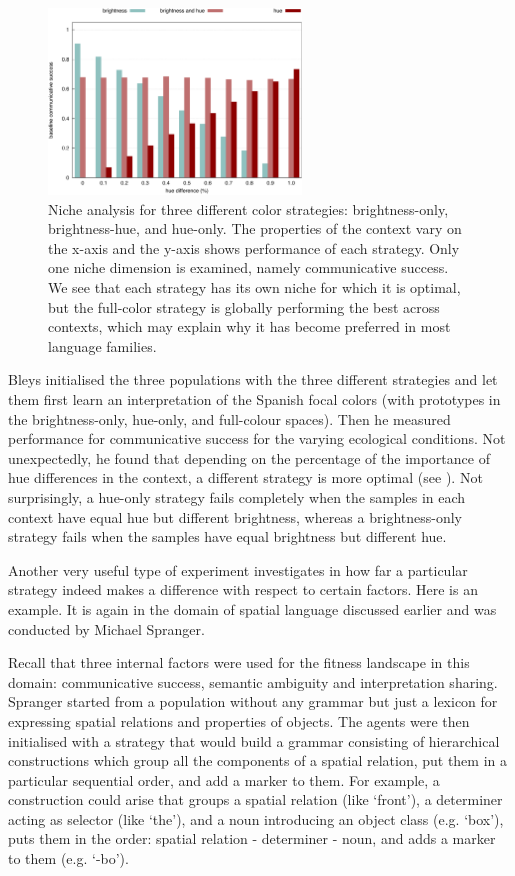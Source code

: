 \begin{figure}[htb!]
\centerline{
\includegraphics[width=0.6\textwidth]{chap12/figs/selective-advantage-bar.pdf}
}
\caption{{Niche analysis for three different 
color strategies: brightness-only, brightness-hue, and hue-only. 
The properties of the context vary on the x-axis and the y-axis shows performance of each strategy.
Only one niche dimension is examined, namely communicative success. 
We see that each strategy has its own niche for which it is optimal, but the full-color strategy is globally 
performing the best across contexts, which may explain why it has become preferred in most language families. 
\label{fig:bar}}
} 
\end{figure} 

Bleys initialised the three populations with the three different strategies and let them first learn an interpretation of 
the Spanish focal colors (with prototypes in the brightness-only, hue-only, and full-colour spaces). Then he measured 
performance for communicative success for the varying ecological conditions. 
Not unexpectedly, he found that depending on the percentage of the importance of hue differences in the context, a different strategy 
is more optimal (see ). Not surprisingly, a hue-only strategy fails completely when the samples in each  
context have equal hue but different brightness, whereas a brightness-only strategy fails when the samples have 
equal brightness but different hue.

Another very useful type of experiment investigates in how far a particular strategy indeed makes a difference 
with respect to certain factors. Here is an example. It is again in the domain of spatial language discussed earlier and 
was conducted by Michael Spranger.

Recall that three internal factors were used 
for the fitness landscape in this domain: communicative success, semantic ambiguity and interpretation sharing. Spranger started from 
a population without any grammar but just a lexicon for expressing spatial relations and properties of objects. 
The agents were then initialised with a strategy that would build a grammar consisting of hierarchical
constructions which group all the components of a spatial relation, put them in a particular sequential order,
and add a marker to them. For example, a construction could arise that groups a spatial relation (like `front'), 
a determiner acting as selector (like `the'), and a noun introducing an object class (e.g. `box'), puts them 
in the order: spatial relation - determiner - noun, and adds a marker to them (e.g. `-bo'). 

